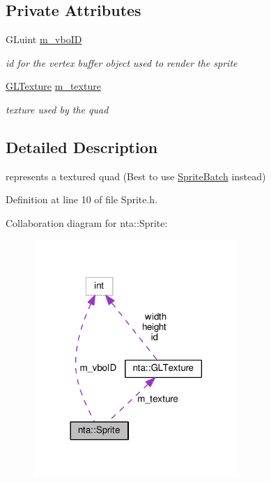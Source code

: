 \subsection*{Private Attributes}
\begin{DoxyCompactItemize}
\item 
\mbox{\label{classnta_1_1Sprite_a2d26de75fa95be871b3143847e22155c}} 
G\+Luint \hyperlink{classnta_1_1Sprite_a2d26de75fa95be871b3143847e22155c}{m\+\_\+vbo\+ID}
\begin{DoxyCompactList}\small\item\em id for the vertex buffer object used to render the sprite \end{DoxyCompactList}\item 
\mbox{\label{classnta_1_1Sprite_ac4fe2c6e0e34d133f5966a3ddc7a583e}} 
\hyperlink{namespacenta_d3/dff/structnta_1_1GLTexture}{G\+L\+Texture} \hyperlink{classnta_1_1Sprite_ac4fe2c6e0e34d133f5966a3ddc7a583e}{m\+\_\+texture}
\begin{DoxyCompactList}\small\item\em texture used by the quad \end{DoxyCompactList}\end{DoxyCompactItemize}


\subsection{Detailed Description}
represents a textured quad (Best to use \hyperlink{classnta_1_1SpriteBatch}{Sprite\+Batch} instead) 

Definition at line 10 of file Sprite.\+h.



Collaboration diagram for nta\+:\+:Sprite\+:\nopagebreak
\begin{figure}[H]
\begin{center}
\leavevmode
\includegraphics[width=221pt]{d8/da7/classnta_1_1Sprite__coll__graph}
\end{center}
\end{figure}


